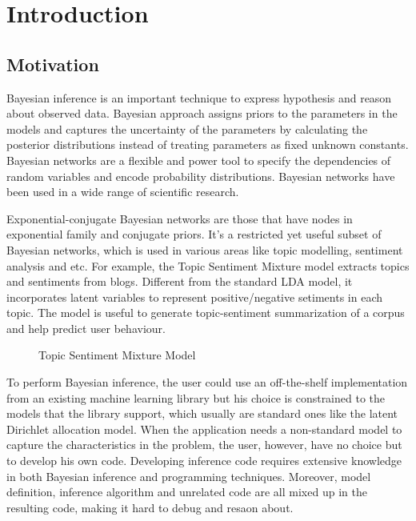 \section{Introduction}
\label{sec:intro}

\subsection{Motivation}

Bayesian inference is an important technique to express hypothesis and reason
about observed data. Bayesian approach assigns priors to the parameters in the
models and captures the uncertainty of the parameters by calculating the
posterior distributions instead of treating parameters as fixed unknown
constants. Bayesian networks are a flexible and power tool to specify the
dependencies of random variables and encode probability distributions.
Bayesian networks have been used in a wide range of scientific research. 

Exponential-conjugate Bayesian networks are those that have nodes in
exponential family and conjugate priors. It's a restricted yet useful subset
of Bayesian networks, which is used in various areas like topic modelling,
sentiment analysis and etc.\cite{Titov2008a, Titov2008b, Jo2011} For example,
the Topic Sentiment Mixture model \cite{Mei2007} extracts topics and
sentiments from blogs. Different from the standard LDA model, it incorporates
latent variables to represent positive/negative setiments in each topic. The
model is useful to generate topic-sentiment summarization of a corpus and help
predict user behaviour.

\begin{figure}[!h]
	\caption{Topic Sentiment Mixture Model}
	\label{fig:TSM_model}
\end{figure}


To perform Bayesian inference, the user could use an off-the-shelf
implementation from an existing machine learning library but his choice is
constrained to the models that the library support, which usually are standard
ones like the latent Dirichlet allocation model. When the application needs a
non-standard model to capture the characteristics in the problem, the user,
however, have no choice but to develop his own code. Developing inference code
requires extensive knowledge in both Bayesian inference and programming
techniques. Moreover, model definition, inference algorithm and unrelated code
are all mixed up in the resulting code, making it hard to debug and resaon
about.

